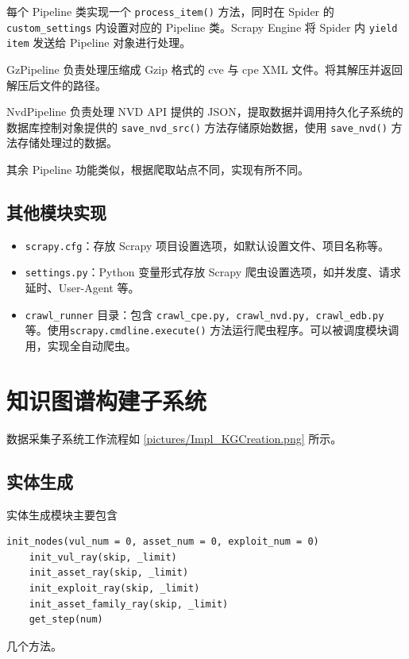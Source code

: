 \documentclass[a4paper,AutoFakeBold,oneside,12pt]{book}
\begin{document}
每个 Pipeline 类实现一个 \lstinline[style = python]|process_item()| 方法，同时在 Spider 的 \lstinline[style = python]|custom_settings| 内设置对应的 Pipeline 类。Scrapy Engine 将 Spider 内 \lstinline[style = python]|yield item| 发送给 Pipeline 对象进行处理。

GzPipeline 负责处理压缩成 Gzip 格式的 cve 与 cpe XML 文件。将其解压并返回解压后文件的路径。

NvdPipeline 负责处理 NVD API 提供的 JSON，提取数据并调用持久化子系统的数据库控制对象提供的 \lstinline|save_nvd_src()| 方法存储原始数据，使用 \lstinline|save_nvd()| 方法存储处理过的数据。

其余 Pipeline 功能类似，根据爬取站点不同，实现有所不同。

\subsection{其他模块实现}

\begin{itemize}
	\item \lstinline|scrapy.cfg|：存放 Scrapy 项目设置选项，如默认设置文件、项目名称等。
	\item \lstinline|settings.py|：Python 变量形式存放 Scrapy 爬虫设置选项，如并发度、请求延时、User-Agent 等。
	\item \lstinline|crawl_runner| 目录：包含 \lstinline|crawl_cpe.py, crawl_nvd.py, crawl_edb.py| 等。使用\linebreak \lstinline|scrapy.cmdline.execute()| 方法运行爬虫程序。可以被调度模块调用，实现全自动爬虫。
\end{itemize}

\section{知识图谱构建子系统}

数据采集子系统工作流程如 \ref{pictures/Impl_KGCreation.png} 所示。


\subsection{实体生成}

实体生成模块主要包含
\begin{lstlisting}[style=lgeneral]
	init_nodes(vul_num = 0, asset_num = 0, exploit_num = 0)
	init_vul_ray(skip, _limit)
	init_asset_ray(skip, _limit)
	init_exploit_ray(skip, _limit)
	init_asset_family_ray(skip, _limit)
	get_step(num)
\end{lstlisting}
几个方法。
\end{document}
